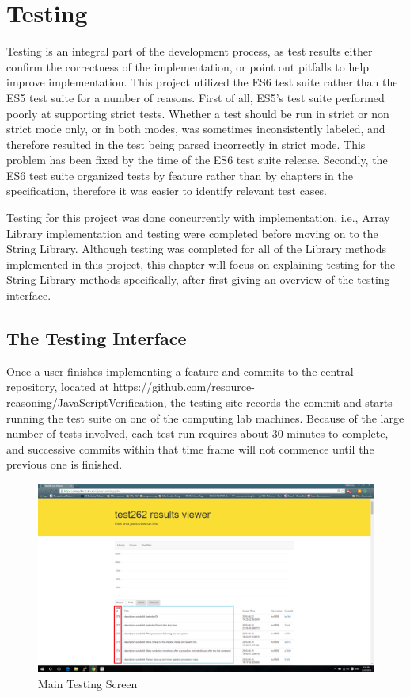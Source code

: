 \documentclass[a4paper,11pt,twoside]{report}
\begin{document}
\chapter{Testing}
Testing is an integral part of the development process, as test results either confirm the correctness of the implementation, or point out pitfalls to help improve implementation. This project utilized the ES6 test suite rather than the ES5 test suite for a number of reasons. First of all, ES5's test suite performed poorly at supporting strict tests. Whether a test should be run in strict or non strict mode only, or in both modes, was sometimes inconsistently labeled, and therefore resulted in the test being parsed incorrectly in strict mode. This problem has been fixed by the time of the ES6 test suite release. Secondly, the ES6 test suite organized tests by feature rather than by chapters in the specification, therefore it was easier to identify relevant test cases.

Testing for this project was done concurrently with implementation, i.e., Array Library implementation and testing were completed before moving on to the String Library. Although testing was completed for all of the Library methods implemented in this project, this chapter will focus on explaining testing for the String Library methods specifically, after first giving an overview of the testing interface.

\section{The Testing Interface}
Once a user finishes implementing a feature and commits to the central repository, located at https://github.com/resource-reasoning/JavaScriptVerification, the testing site records the commit and starts running the test suite on one of the computing lab machines. Because of the large number of tests involved, each test run requires about 30 minutes to complete, and successive commits within that time frame will not commence until the previous one is finished. 

\begin{figure}[h!]
  \caption{Main Testing Screen}
  \includegraphics[width=1.0\textwidth]{main_testing_screen_boxed}
\end{figure}
\end{document}
